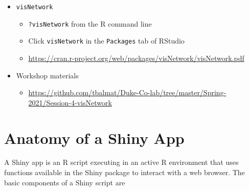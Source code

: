 \documentclass[10pt, letterpaper]{article}
\begin{document}
\begin{spacing}{1.0}
\begin{itemize}
  \item \texttt{visNetwork}
    \begin{itemize}[noitemsep]
        \item \texttt{?visNetwork} from the R command line
        \item Click \texttt{visNetwork} in the \texttt{Packages} tab of RStudio
        \item \url{https://cran.r-project.org/web/packages/visNetwork/visNetwork.pdf}
    \end{itemize}

  \item Workshop materials
    \begin{itemize}
        \item \url{https://github.com/tbalmat/Duke-Co-lab/tree/master/Spring-2021/Session-4-visNetwork}
    \end{itemize}
\end{itemize}


\section{Anatomy of a Shiny App}\label{sec:anatomyofapp}

A Shiny app is an R script executing in an active R environment that uses functions available in the Shiny package to interact with a web browser.  The basic components of a Shiny script are


\end{spacing}
\end{document}
